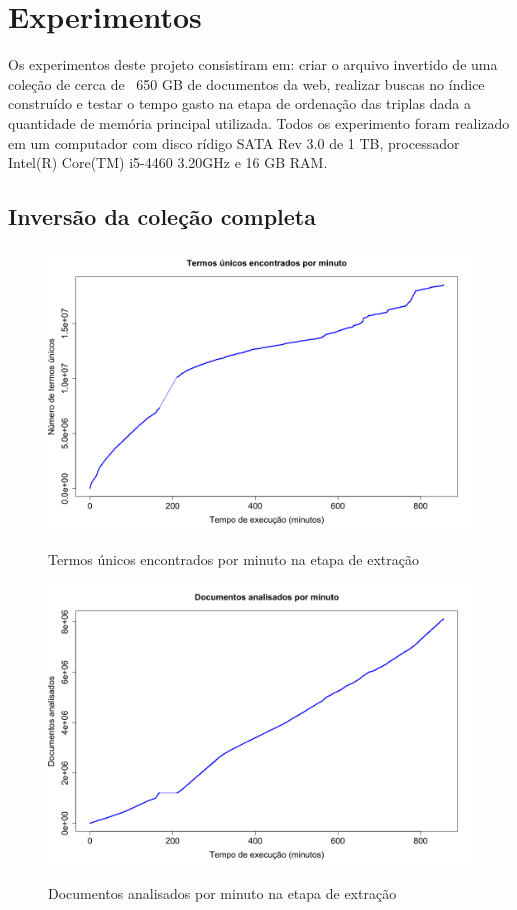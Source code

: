 \documentclass{report}
\begin{document}
\chapter{Experimentos}

Os experimentos deste projeto consistiram em: criar o arquivo invertido de uma coleção de cerca de ~650 GB de documentos da web, realizar buscas no índice 
construído e testar o tempo gasto na etapa de ordenação das triplas dada a quantidade de memória principal utilizada. Todos os experimento foram realizado 
em um computador com disco rídigo SATA Rev 3.0 de 1 TB, processador Intel(R) Core(TM) i5-4460 3.20GHz e 16 GB RAM.

\section{Inversão da coleção completa}

\begin{figure}
\centering
\includegraphics[width=\linewidth]{lexemes.png}
\label{fig:lexemes}
\caption{Termos únicos encontrados por minuto na etapa de extração} 
\end{figure}

\begin{figure}
\centering
\includegraphics[width=\linewidth]{extractor.png}
\label{fig:extractor}
\caption{Documentos analisados por minuto na etapa de extração} 
\end{figure}
\end{document}
